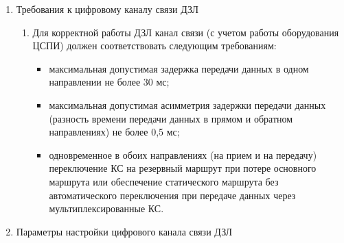 \begin{enumerate}[label=\arabic{section}.\arabic{subsection}.\arabic{enumi}, labelsep=4pt, leftmargin=0pt, itemindent=57pt, itemsep=0pt, parsep=5pt]
\begin{enumerate}[label=\arabic{section}.\arabic{subsection}.\arabic{enumi}.\arabic*, labelsep=4pt, leftmargin=0em, itemindent=65pt, parsep=0pt]
\begin{longtable}{|>{\centering\arraybackslash}m{5.3cm}|>{\centering\arraybackslash}m{3.3cm}|>{\centering\arraybackslash}m{4.2cm}|>{\centering\arraybackslash}m{1.8cm}|>{\centering\arraybackslash}m{1cm}|}
\end{longtable}
\normalsize	

\end{enumerate}


\item Требования к цифровому каналу связи ДЗЛ

\begin{enumerate}[label=\arabic{section}.\arabic{subsection}.\arabic{enumi}.\arabic*, labelsep=4pt, leftmargin=0em, itemindent=65pt, parsep=0pt]

\item
Для корректной работы ДЗЛ канал связи (с учетом работы оборудования ЦСПИ) должен соответствовать следующим требованиям:
\begin{itemize} 
\item максимальная допустимая задержка передачи данных в одном направлении не более 30 мс;
\item максимальная допустимая асимметрия задержки передачи данных (разность времени передачи данных в прямом и обратном направлениях) не более 0,5 мс;
\item одновременное в обоих направлениях (на прием и на передачу) переключение КС на резервный маршрут при потере основного маршрута или обеспечение статического маршрута без автоматического переключения при передаче данных через мультиплексированные КС.
\end{itemize}

\end{enumerate}


\item Параметры настройки цифрового канала связи ДЗЛ

\begin{enumerate}[label=\arabic{section}.\arabic{subsection}.\arabic{enumi}.\arabic*, labelsep=4pt, leftmargin=0em, itemindent=65pt, parsep=0pt]


\end{enumerate}
\end{enumerate}
